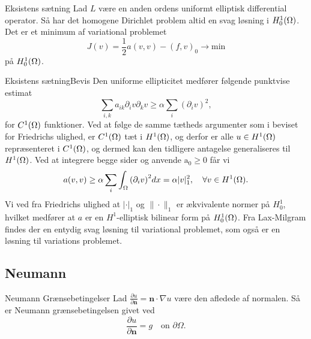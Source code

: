 \begin{frame}{Eksistens sætning}{}
    Lad $L$ være en anden ordens uniformt elliptisk differential operator. Så har det homogene Dirichlet problem altid en svag løsning i $H_0^1(\Omega)$. Det er et minimum af variational problemet
   \begin{equation}
       J(v)=\frac{1}{2} a(v,v) - {(f, v)}_0 \rightarrow \text{min}
   \end{equation}
   på $H_0^1(\Omega)$.
\end{frame}


\begin{frame}{Eksistens sætning}{Bevis}
    Den uniforme ellipticitet medfører følgende punktvise estimat
    \[
        \sum_{i,k} a_{ik} \partial_i v \partial_k v \geq \alpha \sum_i {\left( \partial_i v \right)}^2,
    \]
    for $C^1(\Omega)$ funktioner.
    Ved at følge de samme tætheds argumenter som i beviset for Friedrichs ulighed, er $C^1(\Omega)$ tæt i $H^1(\Omega)$, og derfor er alle $u \in H^1(\Omega)$ repræsenteret i $C^1(\Omega)$, og dermed kan den tidligere antagelse generaliseres til $H^1(\Omega)$.
    Ved at integrere begge sider og anvende $\text{a}_0 \geq 0$ får vi
    \begin{equation}
        a(v,v) \geq \alpha \sum_i \int_\Omega {\left(\partial_i v\right)}^2 dx = \alpha |v|^2_1, \quad \forall v \in H^1(\Omega).
    \end{equation}
    Vi ved fra Friedrichs ulighed at $|\cdot|_1$ og $\| \cdot \|_1$ er ækvivalente normer på $H_0^1$,
    hvilket medfører at $a$ er en $H^1$-elliptisk bilinear form på $H_0^1(\Omega)$.
    Fra Lax-Milgram findes der en entydig svag løsning til variational problemet, som også er en løsning til variations problemet.
\end{frame}

\subsection{Neumann}
\begin{frame}{Neumann Grænsebetingelser}{}
    Lad $\frac{\partial u}{\partial \mathbf{n}}= \mathbf{n}\cdot \nabla u$ være den afledede af normalen. Så er Neumann grænsebetingelsen givet ved
    \begin{equation}
        \frac{\partial u}{\partial \mathbf{n}}  = g\quad \text{on } \partial \Omega.
    \end{equation}
\end{frame}


